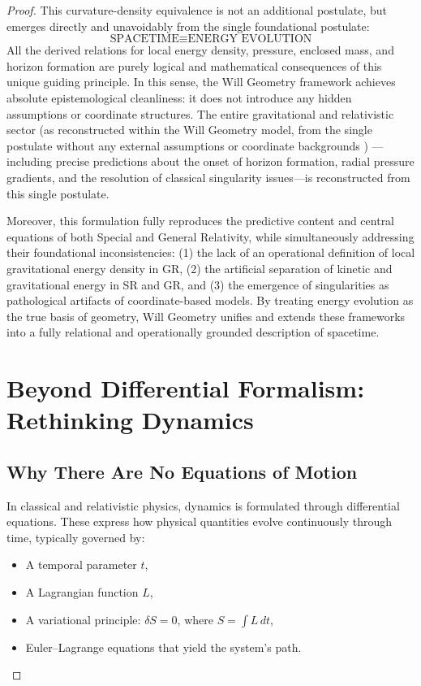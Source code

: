 \documentclass{article}
\begin{document}
\begin{theorem}
\begin{proof}
This curvature-density equivalence is not an additional postulate, but emerges directly and unavoidably from the single foundational postulate:
\[
\boxed{\text{SPACETIME} \equiv \text{ENERGY EVOLUTION}}
\]
All the derived relations for local energy density, pressure, enclosed mass, and horizon formation are purely logical and mathematical consequences of this unique guiding principle. In this sense, the Will Geometry framework achieves absolute epistemological cleanliness: it does not introduce any hidden assumptions or coordinate structures. The entire gravitational and relativistic sector (as reconstructed within the Will Geometry model, from the single postulate without any external assumptions or coordinate backgrounds ) — including precise predictions about the onset of horizon formation, radial pressure gradients, and the resolution of classical singularity issues—is reconstructed from this single postulate.

Moreover, this formulation fully reproduces the predictive content and central equations of both Special and General Relativity, while simultaneously addressing their foundational inconsistencies: (1) the lack of an operational definition of local gravitational energy density in GR, (2) the artificial separation of kinetic and gravitational energy in SR and GR, and (3) the emergence of singularities as pathological artifacts of coordinate-based models. By treating energy evolution as the true basis of geometry, Will Geometry unifies and extends these frameworks into a fully relational and operationally grounded description of spacetime.

\section{Beyond Differential Formalism: Rethinking Dynamics}

\subsection*{Why There Are No Equations of Motion}

In classical and relativistic physics, dynamics is formulated through differential equations.  
These express how physical quantities evolve continuously through time, typically governed by:

\begin{itemize}
    \item A temporal parameter $t$,
    \item A Lagrangian function $L$,
    \item A variational principle: $\delta S = 0$, where $S = \int L\,dt$,
    \item Euler–Lagrange equations that yield the system’s path.
\end{itemize}


\end{proof}
\end{theorem}
\end{document}
